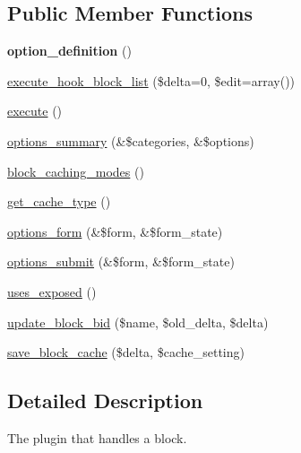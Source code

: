 \subsection*{Public Member Functions}
\begin{DoxyCompactItemize}
\item 
\hypertarget{classviews__plugin__display__block_aaa7cd040bd224b13bb6cada38451b26b}{
{\bfseries option\_\-definition} ()}
\label{classviews__plugin__display__block_aaa7cd040bd224b13bb6cada38451b26b}

\item 
\hyperlink{classviews__plugin__display__block_a9d1df6840d9bda5c36020126332935cf}{execute\_\-hook\_\-block\_\-list} (\$delta=0, \$edit=array())
\item 
\hyperlink{classviews__plugin__display__block_ad673f5b3462304a522ead4293a8f7cef}{execute} ()
\item 
\hyperlink{classviews__plugin__display__block_a52bb2499272275963128bb2beb5804ce}{options\_\-summary} (\&\$categories, \&\$options)
\item 
\hyperlink{classviews__plugin__display__block_ac5a9a1d276df4c6a01a3076be5e4f0aa}{block\_\-caching\_\-modes} ()
\item 
\hyperlink{classviews__plugin__display__block_a4be2fbe3e5f223215268bdd13cdd0312}{get\_\-cache\_\-type} ()
\item 
\hyperlink{classviews__plugin__display__block_a251f0aa56cead04c51c4b1d633826640}{options\_\-form} (\&\$form, \&\$form\_\-state)
\item 
\hyperlink{classviews__plugin__display__block_aaac31f678cc192896bcfdeb1a8a5a2c7}{options\_\-submit} (\&\$form, \&\$form\_\-state)
\item 
\hyperlink{classviews__plugin__display__block_ab0995994a4c7436de2790c7ad8d7ea74}{uses\_\-exposed} ()
\item 
\hyperlink{classviews__plugin__display__block_a7c66bc2e467112a09d809d9d5d2baa20}{update\_\-block\_\-bid} (\$name, \$old\_\-delta, \$delta)
\item 
\hyperlink{classviews__plugin__display__block_a58ba8f810894ad2e7c43c49552005ceb}{save\_\-block\_\-cache} (\$delta, \$cache\_\-setting)
\end{DoxyCompactItemize}


\subsection{Detailed Description}
The plugin that handles a block. 

